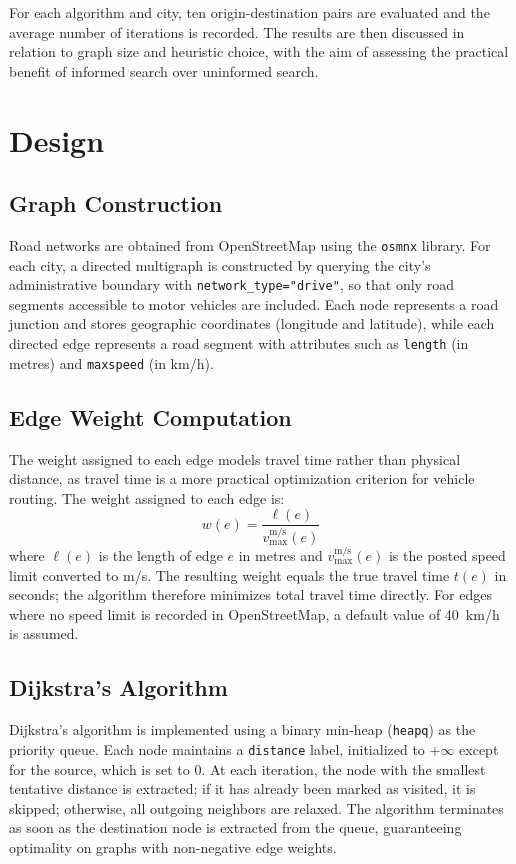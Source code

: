 \documentclass[12pt,a4paper]{article}
\begin{document}
For each algorithm and city, ten origin-destination pairs are evaluated and the average number of iterations is recorded.
The results are then discussed in relation to graph size and heuristic choice, with the aim of assessing the practical benefit of informed search over uninformed search.

\section{Design}

\subsection{Graph Construction}

Road networks are obtained from OpenStreetMap using the \texttt{osmnx} library.
For each city, a directed multigraph is constructed by querying the city's administrative boundary with \texttt{network\_type="drive"}, so that only road segments accessible to motor vehicles are included.
Each node represents a road junction and stores geographic coordinates (longitude and latitude), while each directed edge represents a road segment with attributes such as \texttt{length} (in metres) and \texttt{maxspeed} (in km/h).

\subsection{Edge Weight Computation}

The weight assigned to each edge models travel time rather than physical distance, as travel time is a more practical optimization criterion for vehicle routing.
The weight assigned to each edge is:
\[
  w(e) = \frac{\ell(e)}{v_{\max}^{\text{m/s}}(e)}
\]
where $\ell(e)$ is the length of edge $e$ in metres and $v_{\max}^{\text{m/s}}(e)$ is the posted speed limit converted to m/s.
The resulting weight equals the true travel time $t(e)$ in seconds; the algorithm therefore minimizes total travel time directly.
For edges where no speed limit is recorded in OpenStreetMap, a default value of 40~km/h is assumed.

\subsection{Dijkstra's Algorithm}

Dijkstra's algorithm is implemented using a binary min-heap (\texttt{heapq}) as the priority queue.
Each node maintains a \texttt{distance} label, initialized to $+\infty$ except for the source, which is set to 0.
At each iteration, the node with the smallest tentative distance is extracted; if it has already been marked as visited, it is skipped; otherwise, all outgoing neighbors are relaxed.
The algorithm terminates as soon as the destination node is extracted from the queue, guaranteeing optimality on graphs with non-negative edge weights.
\end{document}

